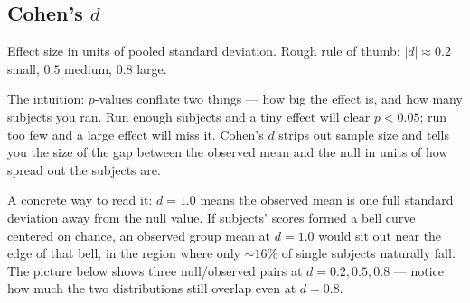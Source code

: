 \documentclass[11pt]{article}
\begin{document}
\subsection{Cohen's $d$}
Effect size in units of pooled standard deviation. Rough rule of thumb:
$|d| \approx 0.2$ small, $0.5$ medium, $0.8$ large.

The intuition: $p$-values conflate two things --- how big the effect is,
and how many subjects you ran. Run enough subjects and a tiny effect
will clear $p < 0.05$; run too few and a large effect will miss it.
Cohen's $d$ strips out sample size and tells you the size of the gap
between the observed mean and the null in units of how spread out the
subjects are.

A concrete way to read it: $d = 1.0$ means the observed mean is one
full standard deviation away from the null value. If subjects' scores
formed a bell curve centered on chance, an observed group mean at
$d = 1.0$ would sit out near the edge of that bell, in the region
where only $\sim 16\%$ of single subjects naturally fall. The picture
below shows three null/observed pairs at $d = 0.2, 0.5, 0.8$ ---
notice how much the two distributions still overlap even at $d = 0.8$.

\begin{center}
\end{center}
\end{document}
